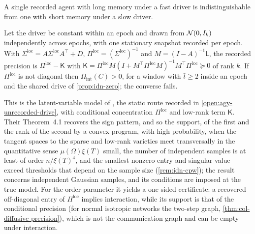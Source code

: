 A single recorded agent with long memory under a fast driver is indistinguishable from one with short memory under a slow driver.

\begin{proposition}\label{prop:idn-static}
Let the driver be constant within an epoch and drawn from $\mathcal{N}(0,I_k)$ independently across epochs, with one stationary snapshot recorded per epoch. With $\Sigma^{\mathrm{loc}}=A\Sigma^{\mathrm{loc}}A^{\top}+D$, $\Pi^{\mathrm{loc}}=(\Sigma^{\mathrm{loc}})^{-1}$ and $M=(I-A)^{-1}\mathsf L$, the recorded precision is $\Pi^{\mathrm{loc}}-\mathsf K$ with $\mathsf K=\Pi^{\mathrm{loc}}M(I+M^{\top}\Pi^{\mathrm{loc}}M)^{-1}M^{\top}\Pi^{\mathrm{loc}}\succeq0$ of rank $k$. If $\Pi^{\mathrm{loc}}$ is not diagonal then $\Omega_{\mathrm{int}}(C)>0$, for a window with $\bar t\ge2$ inside an epoch and the shared drive of \cref{prop:idn-zero}; the converse fails.
\end{proposition}

This is the latent-variable model of \citet{chandrasekaran2012latent}, the static route recorded in \cref{open:agy-unrecorded-drive}, with conditional concentration $\Pi^{\mathrm{loc}}$ and low-rank term $\mathsf K$. Their Theorem~4.1 recovers the sign pattern, and so the support, of the first and the rank of the second by a convex program, with high probability, when the tangent spaces to the sparse and low-rank varieties meet transversally in the quantitative sense $\mu(\Omega)\xi(T)$ small, the number of independent samples is at least of order $n/\xi(T)^4$, and the smallest nonzero entry and singular value exceed thresholds that depend on the sample size (\cref{rem:idn-cpw}); the result concerns independent Gaussian samples, and its conditions are imposed at the true model. For the order parameter it yields a one-sided certificate: a recovered off-diagonal entry of $\Pi^{\mathrm{loc}}$ implies interaction, while its support is that of the conditional precision (for normal isotropic networks the two-step graph, \cref{thm:col-diffusive-precision}), which is not the communication graph and can be empty under interaction.

